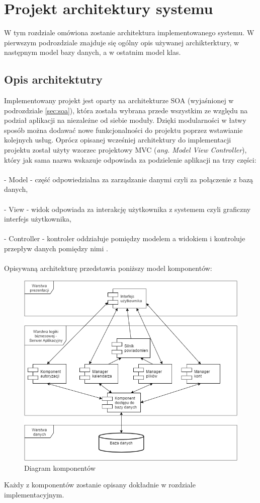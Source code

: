 \chapter{Projekt architektury systemu}
\label{cha:projektSystemu}
W tym rozdziale omówiona zostanie architektura implementowanego systemu. W pierwszym podrozdziale znajduje się ogólny opis używanej archikterktury, w następnym model bazy danych, a w ostatnim model klas.
\section{Opis architektutry}
Implementowany projekt jest oparty na architekturze SOA (wyjaśnionej w podrozdziale \ref{sec:soa}), która została wybrana przede wszystkim ze względu na podział aplikacji na niezależne od siebie moduły. Dzięki modularności w łatwy sposób można dodawać nowe funkcjonalności do projektu poprzez wstawianie kolejnych usług. Oprócz opisanej wcześniej architektury do implementacji projektu został użyty wzorzec projektowy MVC (\textit{ang. Model View Controller}), który jak sama nazwa wskazuje odpowiada za podzielenie aplikacji na trzy części:\\\\
- Model - część odpowiedzialna za zarządzanie danymi czyli za połączenie z bazą danych,\\\\
- View - widok odpowiada za interakcję użytkownika z systemem czyli graficzny interfejs użytkownika,\\\\
- Controller - kontroler oddziałuje pomiędzy modelem a widokiem i kontroluje przepływ danych pomiędzy nimi \cite{MVC01}.\\\\
\newpage
Opisywaną architekturę przedstawia poniższy model komponentów:
\begin{figure}[H]
\centering
\includegraphics[scale=0.5]{ArchitekturaSystemu}
\caption{\label{fig:diag_01}Diagram komponentów}
\end{figure}
Każdy z komponentów zostanie opisany dokładnie w rozdziale implementacyjnym.

